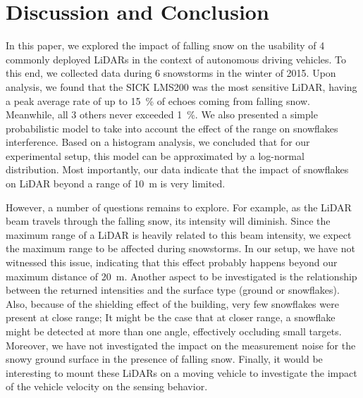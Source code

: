 \section{Discussion and Conclusion}

In this paper, we explored the impact of falling snow on the usability of 4 commonly deployed LiDARs in the context of autonomous driving vehicles. To this end, we collected data during 6 snowstorms in the winter of 2015. Upon analysis, we found that the SICK LMS200 was the most sensitive LiDAR, having a peak average rate of up to 15~\% of echoes coming from falling snow. Meanwhile, all 3 others never exceeded 1~\%. We also presented a simple probabilistic model to take into account the effect of the range on snowflakes interference. Based on a histogram analysis, we concluded that for our experimental setup, this model can be approximated by a log-normal distribution. Most importantly, our data indicate that the impact of snowflakes on LiDAR beyond a range of \SI{10}{\meter} is very limited. 


However, a number of questions remains to explore. For example, as the LiDAR beam travels through the falling snow, its intensity will diminish. Since the maximum range of a LiDAR is heavily related to this beam intensity, we expect the maximum range to be affected during snowstorms. In our setup, we have not witnessed this issue, indicating that this effect probably happens beyond our maximum distance of \SI{20}{\meter}. Another aspect to be investigated is the relationship between the returned intensities and the surface type (ground or snowflakes). Also, because of the shielding effect of the building, very few snowflakes were present at close range; It might be the case that at closer range, a snowflake might be detected at more than one angle, effectively occluding small targets. Moreover, we have not investigated the impact on the measurement noise for the snowy ground surface in the presence of falling snow. Finally, it would be interesting to mount these LiDARs on a moving vehicle to investigate the impact of the vehicle velocity on the sensing behavior.


